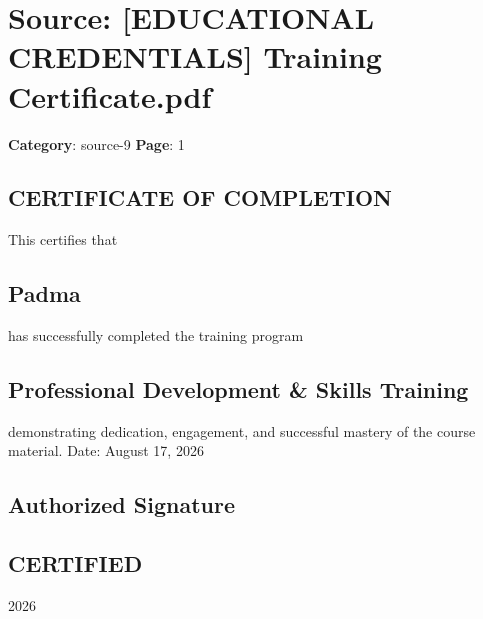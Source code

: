 \section*{Source: [EDUCATIONAL CREDENTIALS] Training Certificate.pdf}
\textbf{Category}: source-9
\textbf{Page}: 1

\subsection*{CERTIFICATE OF COMPLETION}

This certifies that

\subsection*{Padma}

has successfully completed the training program

\subsection*{Professional Development \& Skills Training}

demonstrating dedication, engagement, and successful mastery of the course material. Date: August 17, 2026

\subsection*{Authorized Signature}

\subsection*{CERTIFIED}

2026